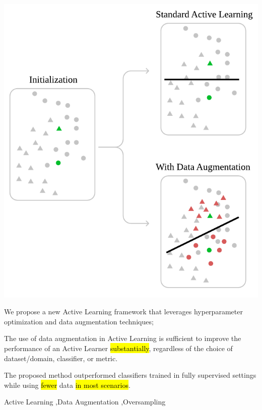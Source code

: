 \documentclass[preprint, 12pt]{elsarticle}
\begin{document}
\begin{frontmatter}
\begin{graphicalabstract}
    \includegraphics{../analysis/graphical_abstract}
\end{graphicalabstract}

\begin{highlights}
    \item We propose a new Active Learning framework that leverages
        hyperparameter optimization and data augmentation techniques;
    \item The use of data augmentation in Active Learning is sufficient to
        improve the performance of an Active Learner \hl{substantially}, regardless
        of the choice of dataset/domain, classifier, or metric.
    \item The proposed method outperformed classifiers
        trained in fully supervised settings while using \hl{fewer} data
        \hl{in most scenarios}.
\end{highlights}

\begin{keyword}
Active Learning \sep\@ Data Augmentation \sep\@ Oversampling
\end{keyword}

\end{frontmatter}
\end{document}
